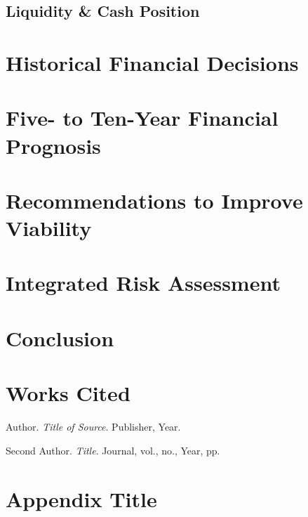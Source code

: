 \documentclass[12pt]{report}
\renewcommand\thesection{\arabic{section}.}
\newcommand{\mlaentry}[1]{\hangindent=0.5in\noindent #1\par}
\begin{document}
\subsection{Liquidity \& Cash Position}
\lipsum[8]

\section{Historical Financial Decisions}
\lipsum[9]

\section{Five- to Ten-Year Financial Prognosis}
\lipsum[10]

\section{Recommendations to Improve Viability}
\lipsum[11]

\section{Integrated Risk Assessment}
\lipsum[12]

\section{Conclusion}
\lipsum[13]

\newpage
\section*{Works Cited}
\begingroup
\setlength{\parindent}{-0.5in}
\setlength{\leftskip}{0.5in}
\mlaentry{Author. \textit{Title of Source}. Publisher, Year.}
\mlaentry{Second Author. \textit{Title}. Journal, vol., no., Year, pp.}
\endgroup

\appendix
\renewcommand\thesection{\Alph{section}}
\section{Appendix Title}
\lipsum[14]
\end{document}
